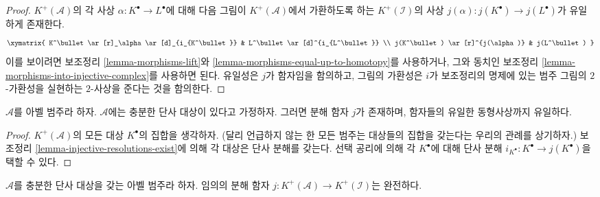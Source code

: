 \begin{proof}
$K^{+}(\mathcal{A})$의 각 사상 $\alpha : K^\bullet \to L^\bullet$에 대해
다음 그림이 $K^{+}(\mathcal{A})$에서 가환하도록 하는
$K^{+}(\mathcal{I})$의 사상
$j(\alpha) : j(K^\bullet) \to j(L^\bullet)$가 유일하게 존재한다.
$$
\xymatrix{
K^\bullet \ar[r]_\alpha \ar[d]_{i_{K^\bullet}} &
L^\bullet \ar[d]^{i_{L^\bullet}} \\
j(K^\bullet) \ar[r]^{j(\alpha)} & j(L^\bullet)
}
$$
이를 보이려면 보조정리 \ref{lemma-morphisms-lift}와
\ref{lemma-morphisms-equal-up-to-homotopy}를 사용하거나, 그와 동치인
보조정리 \ref{lemma-morphisms-into-injective-complex}를 사용하면 된다.
유일성은 $j$가 함자임을 함의하고, 그림의 가환성은 $i$가 보조정리의
명제에 있는 범주 그림의 $2$-가환성을 실현하는 $2$-사상을 준다는 것을
함의한다.
\end{proof}

\begin{lemma}
\label{lemma-into-derived-category}
$\mathcal{A}$를 아벨 범주라 하자. $\mathcal{A}$에는 충분한 단사 대상이
있다고 가정하자. 그러면 분해 함자 $j$가 존재하며, 함자들의 유일한
동형사상까지 유일하다.
\end{lemma}

\begin{proof}
$K^{+}(\mathcal{A})$의 모든 대상 $K^\bullet$의 집합을 생각하자.
(달리 언급하지 않는 한 모든 범주는 대상들의 집합을 갖는다는 우리의
관례를 상기하자.) 보조정리 \ref{lemma-injective-resolutions-exist}에 의해
각 대상은 단사 분해를 갖는다. 선택 공리에 의해 각 $K^\bullet$에 대해
단사 분해 $i_{K^\bullet} : K^\bullet \to j(K^\bullet)$을 택할 수 있다.
\end{proof}

\begin{lemma}
\label{lemma-j-is-exact}
$\mathcal{A}$를 충분한 단사 대상을 갖는 아벨 범주라 하자. 임의의 분해
함자 $j : K^{+}(\mathcal{A}) \to K^{+}(\mathcal{I})$는 완전하다.
\end{lemma}

